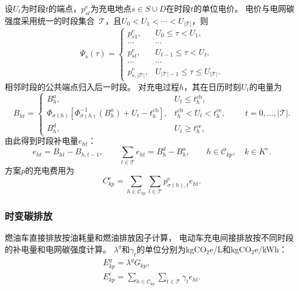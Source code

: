 \documentclass{setp-new}
\begin{document}
设$U_t$为时段$t$的端点，$p_{st}^{\mathrm e}$为充电地点$s\in S\cup D$在时段$t$的单位电价。
电价与电网碳强度采用统一的时段集合~$\mathcal T$，且$U_0<U_1<\cdots<U_{|\mathcal T|}$\cite{ref:94}，则
\begin{equation}
\Psi_s(\tau)=
\begin{cases}
p_{s1}^{\mathrm e}, & U_0\le\tau<U_1,\\
\cdots & \cdots\\
p_{st}^{\mathrm e}, & U_{t-1}\le\tau<U_t,\\
\cdots & \cdots\\
p_{s,|\mathcal T|}^{\mathrm e}, & U_{|\mathcal T|-1}\le\tau\le U_{|\mathcal T|}.
\end{cases}
\label{eq:unified-price-function}
\end{equation}
相邻时段的公共端点归入后一时段。
对充电过程$h$，其在日历时刻$U_t$的电量为\cite{ref:94}
\begin{equation}
B_{ht}=
\begin{cases}
B_h^{a}, & U_t\le t_h^{\mathrm{cb}},\\
\Phi_{\sigma(h)}\!\left[
\Phi_{\sigma(h)}^{-1}(B_h^{a})+U_t-t_h^{\mathrm{cb}}
\right], & t_h^{\mathrm{cb}}<U_t<t_h^{\mathrm{ce}},\\
B_h^{d}, & U_t\ge t_h^{\mathrm{ce}},
\end{cases}
\qquad t=0,\ldots,|\mathcal T|.
\label{eq:unified-charge-calendar-energy}
\end{equation}
由此得到时段补电量$e_{ht}$：
\begin{equation}
e_{ht}=B_{ht}-B_{h,t-1},\qquad
\sum_{t\in\mathcal T}e_{ht}=B_h^{d}-B_h^{a},\qquad
h\in\mathcal C_{kp},\quad k\in K^{e}.
\label{eq:unified-charge-balance}
\end{equation}
方案$p$的充电费用为
\begin{equation}
C_{kp}^{\mathrm e}
=\sum_{h\in\mathcal C_{kp}}\sum_{t\in\mathcal T}
p_{\sigma(h),t}^{\mathrm e}e_{ht}.
\label{eq:unified-charge-cost}
\end{equation}

\subsubsection{时变碳排放}

燃油车直接排放按油耗量和燃油排放因子计算\cite{ref:95}，
电动车充电间接排放按不同时段的补电量和电网碳强度计算\cite{ref:deng}。
$\lambda^{g}$和$\gamma_t$的单位分别为kgCO$_2$e/L和kgCO$_2$e/kWh：
\begin{gather}
E_{kp}^{g}=\lambda^{g}G_{kp},
\label{eq:unified-direct-emission}\\
E_{kp}^{e}=\sum_{h\in\mathcal C_{kp}}\sum_{t\in\mathcal T}\gamma_t e_{ht}.
\label{eq:unified-indirect-emission}
\end{gather}
\end{document}
